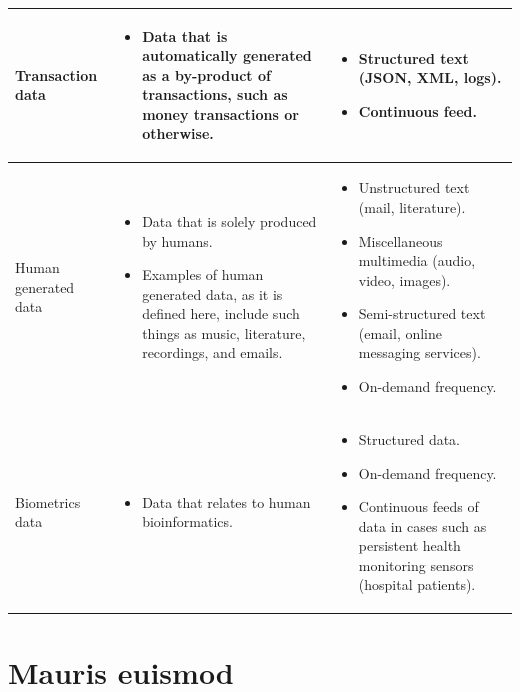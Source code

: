 \documentclass[a4paper,11pt]{article}
\begin{document}
\begin{appendices}
\begin{table}[H]
\begin{tabular}{ | p{2cm} | p{8cm} | p{7.5cm} | }
Transaction data
&
\begin{itemize}[leftmargin=*]
  \item Data that is automatically generated as a by-product of transactions, such as money transactions or otherwise.
\end{itemize}
&
\begin{itemize}[leftmargin=*]
  \item Structured text (JSON, XML, logs).
  \item Continuous feed.
\end{itemize}
\\ \hline

Human generated data
&
\begin{itemize}[leftmargin=*]
  \item Data that is solely produced by humans.
  \item Examples of human generated data, as it is defined here, include such things as music, literature, recordings,
  and emails.
\end{itemize}
&
\begin{itemize}[leftmargin=*]
  \item Unstructured text (mail, literature).
  \item Miscellaneous multimedia (audio, video, images).
  \item Semi-structured text (email, online messaging services).
  \item On-demand frequency.
\end{itemize}
\\ \hline

 Biometrics data
 &
 \begin{itemize}[leftmargin=*]
   \item Data that relates to human bioinformatics.
 \end{itemize}
 &
 \begin{itemize}[leftmargin=*]
   \item Structured data.
   \item On-demand frequency.
   \item Continuous feeds of data in cases such as persistent health monitoring sensors (\ie{}hospital patients).
 \end{itemize}
 \\ \hline

\end{tabular}
\hspace*{5cm}
\end{table}

\newpage
\section{Mauris euismod}

\end{appendices}
\end{document}
